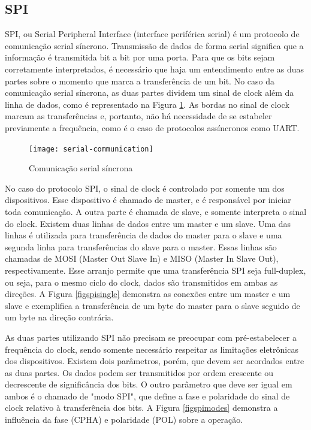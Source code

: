 \documentclass[11pt]{article}
\begin{document}
\subsection{SPI}
\tab SPI, ou Serial Peripheral Interface (interface periférica serial) é um protocolo de comunicação serial síncrono. Transmissão de dados de forma serial significa que a informação é transmitida bit a bit por uma porta. Para que os bits sejam corretamente interpretados, é necessário que haja um entendimento entre as duas partes sobre o momento que marca a transferência de um bit. No caso da comunicação serial síncrona, as duas partes dividem um sinal de clock além da linha de dados, como é representado na Figura \ref{figserial}. As bordas no sinal de clock marcam as transferências e, portanto, não há necessidade de se estabeler previamente a frequência, como é o caso de protocolos assíncronos como UART. 
\begin{figure}
    \centering
    \texttt{[image: serial-communication]}
    \caption{Comunicação serial síncrona}
    \label{figserial}
\end{figure}
\par No caso do protocolo SPI, o sinal de clock é controlado por somente um dos dispositivos. Esse dispositivo é chamado de master, e é responsável por iniciar toda comunicação. A outra parte é chamada de slave, e somente interpreta o sinal do clock. Existem duas linhas de dados entre um master e um slave. Uma das linhas é utilizada para transferência de dados do master para o slave e uma segunda linha para transferências do slave para o master. Essas linhas são chamadas de MOSI (Master Out Slave In) e MISO (Master In Slave Out), respectivamente. Esse arranjo permite que uma transferência SPI seja full-duplex, ou seja, para o mesmo ciclo do clock, dados são transmitidos em ambas as direções. A Figura \ref{figspisingle} demonstra as conexões entre um master e um slave e exemplifica a transferência de um byte do master para o slave seguido de um byte na direção contrária.
\par As duas partes utilizando SPI não precisam se preocupar com pré-estabelecer a frequência do clock, sendo somente necessário respeitar as limitações eletrônicas dos dispositivos. Existem dois parâmetros, porém, que devem ser acordados entre as duas partes. Os dados podem ser transmitidos por ordem crescente ou decrescente de significância dos bits. O outro parâmetro que deve ser igual em ambos é o chamado de "modo SPI", que define a fase e polaridade do sinal de clock relativo à transferência dos bits. A Figura \ref{figspimodes} demonstra a influência da fase (CPHA) e polaridade (POL) sobre a operação.
\end{document}
